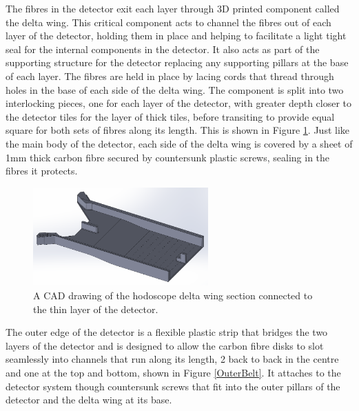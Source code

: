The fibres in the detector exit each layer through 3D printed component called the delta wing. This critical component acts to channel the fibres out of each layer of the detector, holding them in place and helping to facilitate a light tight seal for the internal components in the detector. It also acts as part of the supporting structure for the detector replacing any supporting pillars at the base of each layer. The fibres are held in place by lacing cords that thread through holes in the base of each side of the delta wing. The component is split into two interlocking pieces, one for each layer of the detector, with greater depth closer to the detector tiles for the layer of thick tiles, before transiting to provide equal square for both sets of fibres along its length. This is shown in Figure \ref{Deltawingsummary}. Just like the main body of the detector, each side of the delta wing is covered by a sheet of 1mm thick carbon fibre secured by countersunk plastic screws, sealing in the fibres it protects. 

\begin{figure}
	\centering
	\includegraphics[width=0.6\textwidth]{ImgChap1/deltawingside}
	\caption{A CAD drawing of the hodoscope delta wing section connected to the thin layer of the detector.}
	\label{Deltawingsummary}
\end{figure}

The outer edge of the detector is a flexible plastic strip that bridges the two layers of the detector and is designed to allow the carbon fibre disks to slot seamlessly into channels that run along its length, 2 back to back in the centre and one at the top and bottom, shown in Figure \ref{OuterBelt}. It attaches to the detector system though countersunk screws that fit into the outer pillars of the detector and the delta wing at its base.

